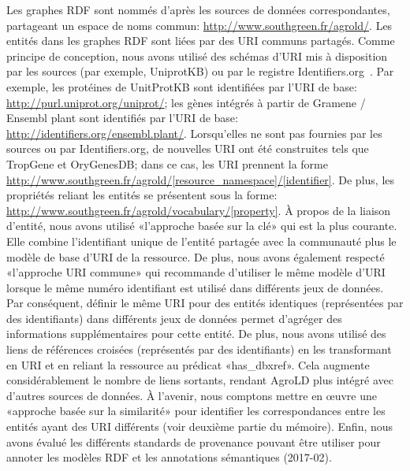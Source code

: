 Les graphes RDF sont nommés d'après les sources de données correspondantes, partageant un espace de noms commun: \url{http://www.southgreen.fr/agrold/}. Les entités dans les graphes RDF sont liées par des URI communs partagés. Comme principe de conception, nous avons utilisé des schémas d'URI mis à disposition par les sources (par exemple, UniprotKB) ou par le registre Identifiers.org~\cite{identifiers}. Par exemple, les protéines de UnitProtKB sont identifiées par l'URI de base: \url{http://purl.uniprot.org/uniprot/}; les gènes intégrés à partir de Gramene / Ensembl plant sont identifiés par l'URI de base: \url{http://identifiers.org/ensembl.plant/}. Lorsqu'elles ne sont pas fournies par les sources ou par Identifiers.org, de nouvelles URI ont été construites tels que TropGene et OryGenesDB; dans ce cas, les URI prennent la forme \url{http://www.southgreen.fr/agrold/[resource\_namespace]/[identifier]}. De plus, les propriétés reliant les entités se présentent sous la forme: \url{http://www.southgreen.fr/agrold/vocabulary/[property]}. À propos de la liaison d'entité, nous avons utilisé «l'approche basée sur la clé» qui est la plus courante. Elle combine l'identifiant unique de l'entité partagée avec la communauté plus le modèle de base d'URI de la ressource. De plus, nous avons également respecté «l’approche URI commune» qui recommande d’utiliser le même modèle d’URI lorsque le même numéro identifiant est utilisé dans différents jeux de données. Par conséquent, définir le même URI pour des entités identiques (représentées par des identifiants) dans différents jeux de données permet d'agréger des informations supplémentaires pour cette entité. De plus, nous avons utilisé des liens de références croisées (représentés par des identifiants) en les transformant en URI et en reliant la ressource au prédicat «has\_dbxref». Cela augmente considérablement le nombre de liens sortants, rendant AgroLD plus intégré avec d'autres sources de données. À l'avenir, nous comptons mettre en œuvre une «approche basée sur la similarité» pour identifier les correspondances entre les entités ayant des URI différents (voir deuxième partie du mémoire). Enfin, nous avons évalué les différents standards de provenance pouvant être utiliser pour annoter les modèles RDF et les annotations sémantiques (2017-02).\\

